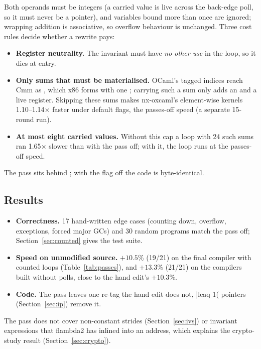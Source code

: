Both operands must be integers (a carried value is live across the back-edge
poll, so it must never be a pointer), and variables bound more than once are
ignored; wrapping addition is associative, so overflow behaviour is
unchanged. Three cost rules decide whether a rewrite pays:

\begin{itemize}
  \item \textbf{Register neutrality.} The invariant must have \emph{no other
        use} in the loop, so it dies at entry.
  \item \textbf{Only sums that must be materialised.} OCaml's tagged indices
        reach Cmm as , which x86 forms with one
        ; carrying such a sum only adds an  and a live
        register. Skipping these sums makes nx-oxcaml's element-wise kernels
        1.10--1.14$\times$ faster under default flags, the passes-off speed
        (a separate 15-round run).
  \item \textbf{At most eight carried values.} Without this cap a loop with 24
        such sums ran 1.65$\times$ slower than with the pass off; with it, the
        loop runs at the passes-off speed.
\end{itemize}

The pass sits behind ; with the flag off
the code is byte-identical.

\subsection{Results}
\begin{itemize}
  \item \textbf{Correctness.} 17 hand-written edge cases (counting down,
        overflow, exceptions, forced major GCs) and 30 random programs match
        the pass off; Section~\ref{sec:counted} gives the test suite.
  \item \textbf{Speed on unmodified source.} $+10.5\%$ (19/21) on the
        final compiler with counted loops (Table~\ref{tab:passes}), and
        $+13.3\%$ (21/21) on the compilers built without polls, close to
        the hand edit's $+10.3\%$.
  \item \textbf{Code.} The pass leaves one re-tag the hand edit does not,
        \ainl|leaq 1(%
        pointers (Section~\ref{sec:ip}) remove it.
\end{itemize}

The pass does not cover non-constant strides (Section~\ref{sec:ivs}) or
invariant expressions that flambda2 has inlined into an address, which
explains the crypto-study result (Section~\ref{sec:crypto}).
